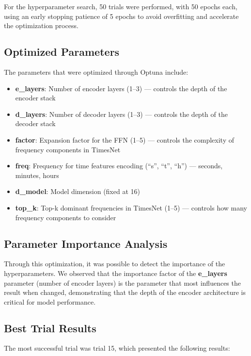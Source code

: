 For the hyperparameter search, 50 trials were performed, with 50 epochs each, using an early stopping patience of 5 epochs to avoid overfitting and accelerate the optimization process.

\subsection{Optimized Parameters}

The parameters that were optimized through Optuna include:

\begin{itemize}
    \item \textbf{e\_layers}: Number of encoder layers (1--3) --- controls the depth of the encoder stack
    \item \textbf{d\_layers}: Number of decoder layers (1--3) --- controls the depth of the decoder stack  
    \item \textbf{factor}: Expansion factor for the FFN (1--5) --- controls the complexity of frequency components in TimesNet
    \item \textbf{freq}: Frequency for time features encoding (``s'', ``t'', ``h'') --- seconds, minutes, hours
    \item \textbf{d\_model}: Model dimension (fixed at 16)
    \item \textbf{top\_k}: Top-k dominant frequencies in TimesNet (1--5) --- controls how many frequency components to consider
\end{itemize}

\subsection{Parameter Importance Analysis}

Through this optimization, it was possible to detect the importance of the hyperparameters. We observed that the importance factor of the \textbf{e\_layers} parameter (number of encoder layers) is the parameter that most influences the result when changed, demonstrating that the depth of the encoder architecture is critical for model performance.

\subsection{Best Trial Results}

The most successful trial was trial 15, which presented the following results:

